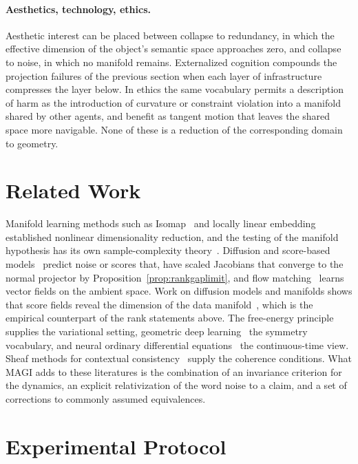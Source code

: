 \documentclass[11pt,a4paper]{article}
\theoremstyle{definition}
\theoremstyle{remark}
\begin{document}
\paragraph{Aesthetics, technology, ethics.}
Aesthetic interest can be placed between collapse to redundancy, in which the
effective dimension of the object's semantic space approaches zero, and
collapse to noise, in which no manifold remains. Externalized cognition
compounds the projection failures of the previous section when each layer of
infrastructure compresses the layer below. In ethics the same vocabulary
permits a description of harm as the introduction of curvature or constraint
violation into a manifold shared by other agents, and benefit as tangent
motion that leaves the shared space more navigable. None of these is a
reduction of the corresponding domain to geometry.

\section{Related Work}

Manifold learning methods such as Isomap~\cite{tenenbaum2000isomap} and
locally linear embedding~\cite{roweis2000lle} established nonlinear
dimensionality reduction, and the testing of the manifold hypothesis has its
own sample-complexity theory~\cite{fefferman2016testing,aamari2019nonasymptotic}.
Diffusion and score-based
models~\cite{ho2020denoising,song2021score} predict noise or scores that, have scaled Jacobians that converge to the normal projector by Proposition~\ref{prop:rankgaplimit},
and flow matching~\cite{lipman2023flow} learns vector fields on the ambient
space. Work on diffusion models and manifolds shows that score fields reveal
the dimension of the data manifold~\cite{stanczuk2022diffusion,pidstrigach2022score},
which is the empirical counterpart of the rank statements above. The
free-energy principle~\cite{friston2010freeenergy} supplies the variational
setting, geometric deep learning~\cite{bronstein2021geometric} the symmetry
vocabulary, and neural ordinary differential equations~\cite{chen2018neuralode}
the continuous-time view. Sheaf methods for contextual
consistency~\cite{abramsky2011sheaf,robinson2014topological} supply the
coherence conditions. What MAGI adds to these literatures is the combination of an
invariance criterion for the dynamics, an explicit relativization of the word
noise to a claim, and a set of corrections to commonly assumed equivalences.

\section{Experimental Protocol}\label{sec:protocol}
\end{document}
